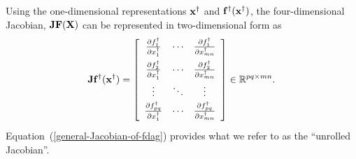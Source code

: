 \documentclass[10pt,pdftex]{article}
\begin{document}
Using the one-dimensional representations $\mathbf{x}^{\dag}$ and
$\mathbf{f}^{\dag}(\mathbf{x}^{\dag})$, the four-dimensional Jacobian,
$\mathbf{J}\mathbf{F}(\mathbf{X})$ can be represented in two-dimensional form as
\begin{equation}\label{general-Jacobian-of-fdag}
  \bfJ\bff^\dag(\bfx^\dag) =
  \left[
    \begin{array}{ccc}
      \pd{f^\dag_1}{x^\dag_1} & \cdots & \pd{f^\dag_1}{x^\dag_{mn}} \vspace{4pt} \\
      \pd{f^\dag_2}{x^\dag_1} & \cdots & \pd{f^\dag_2}{x^\dag_{mn}} \vspace{2pt} \\
      \vdots & \ddots & \vdots \vspace{2pt} \\
      \pd{f^\dag_{pq}}{x^\dag_1} & \cdots & \pd{f^\dag_{pq}}{x^\dag_{mn}} \vspace{2pt} \\
    \end{array}
  \right]\in\bbR^{pq\times mn}.
\end{equation}
Equation~(\ref{general-Jacobian-of-fdag}) provides what we refer to as the ``unrolled Jacobian''.


\renewcommand{\baselinestretch}{1}
\normalsize
\normalfont


\end{document}
